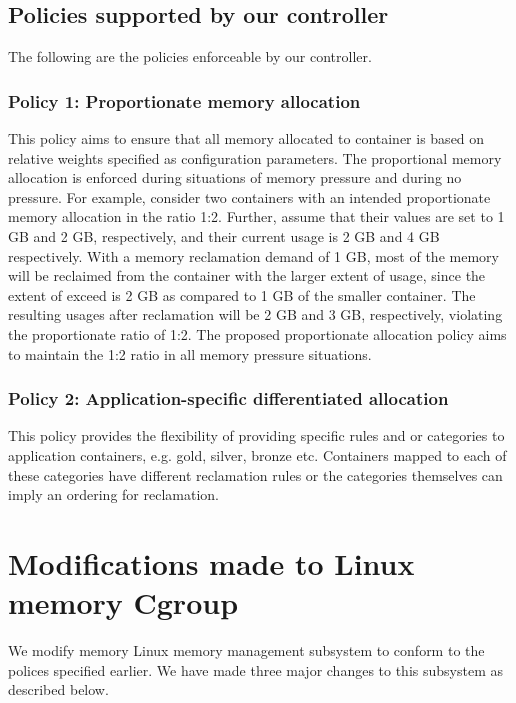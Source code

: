      \subsection{Policies supported by our controller}
      
	The following are the policies enforceable by our controller.  
	
	\subsubsection{Policy 1: Proportionate memory allocation}
	  This policy aims to ensure that all memory allocated to container is based on relative weights specified as configuration parameters.
	  The proportional memory allocation is enforced during situations of memory pressure and during no pressure. For example, consider 
	  two containers with an intended proportionate memory allocation in the ratio 1:2. Further, assume that their \sol{} values are set 
	  to 1 GB and 2 GB, respectively, and their current usage is 2 GB and 4 GB respectively.
	  With a memory reclamation demand of 1 GB, most of the memory will be reclaimed from the container with the larger extent of usage, 
	  since the extent of exceed is 2 GB as compared to 1 GB of the smaller container. The resulting usages after reclamation will be 2 GB 
	  and 3 GB, respectively, violating the proportionate ratio of 1:2. The proposed proportionate allocation policy aims to maintain 
	  the 1:2 ratio in all memory pressure situations.
	
	\subsubsection{Policy 2: Application-specific differentiated allocation}
	\label{sec:memory_distribution}
	  This policy provides the flexibility of providing specific rules and or categories to application containers, e.g. gold, silver,
	  bronze etc. Containers mapped to each of these categories have different reclamation rules or the categories themselves can 
	  imply an ordering for reclamation.
  
  \section{Modifications made to Linux memory Cgroup}
      
      We modify memory Linux \cg{} memory management subsystem to conform to the polices specified earlier. We have made
      three major changes to this subsystem as described below.
     
